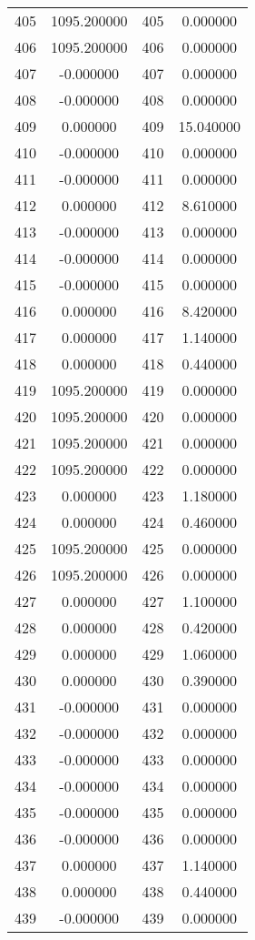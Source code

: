 \documentclass[12pt]{article}
\begin{document}
\begin{longtable}{@{}cccc@{}}
405 & 1095.200000 & 405 & 0.000000 \\
406 & 1095.200000 & 406 & 0.000000 \\
407 & -0.000000 & 407 & 0.000000 \\
408 & -0.000000 & 408 & 0.000000 \\
409 & 0.000000 & 409 & 15.040000 \\
410 & -0.000000 & 410 & 0.000000 \\
411 & -0.000000 & 411 & 0.000000 \\
412 & 0.000000 & 412 & 8.610000 \\
413 & -0.000000 & 413 & 0.000000 \\
414 & -0.000000 & 414 & 0.000000 \\
415 & -0.000000 & 415 & 0.000000 \\
416 & 0.000000 & 416 & 8.420000 \\
417 & 0.000000 & 417 & 1.140000 \\
418 & 0.000000 & 418 & 0.440000 \\
419 & 1095.200000 & 419 & 0.000000 \\
420 & 1095.200000 & 420 & 0.000000 \\
421 & 1095.200000 & 421 & 0.000000 \\
422 & 1095.200000 & 422 & 0.000000 \\
423 & 0.000000 & 423 & 1.180000 \\
424 & 0.000000 & 424 & 0.460000 \\
425 & 1095.200000 & 425 & 0.000000 \\
426 & 1095.200000 & 426 & 0.000000 \\
427 & 0.000000 & 427 & 1.100000 \\
428 & 0.000000 & 428 & 0.420000 \\
429 & 0.000000 & 429 & 1.060000 \\
430 & 0.000000 & 430 & 0.390000 \\
431 & -0.000000 & 431 & 0.000000 \\
432 & -0.000000 & 432 & 0.000000 \\
433 & -0.000000 & 433 & 0.000000 \\
434 & -0.000000 & 434 & 0.000000 \\
435 & -0.000000 & 435 & 0.000000 \\
436 & -0.000000 & 436 & 0.000000 \\
437 & 0.000000 & 437 & 1.140000 \\
438 & 0.000000 & 438 & 0.440000 \\
439 & -0.000000 & 439 & 0.000000 \\

\end{longtable}
\end{document}
